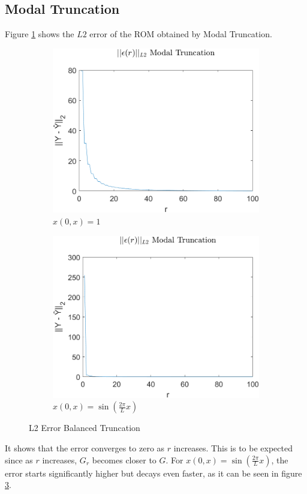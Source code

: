 \subsection{Modal Truncation}
Figure \ref{FIG-ERR-MT} shows the \(L2\) error of the ROM obtained by Modal Truncation.
\begin{figure}[H]
\begin{subfigure}[b]{0.5\textwidth}
\centering
\includegraphics[width=\textwidth]{images/L2_MT}
\caption{$x(0, x) = 1$}
\label{FIG-ERR-MT}
\end{subfigure}
\begin{subfigure}[b]{0.5\textwidth}
\centering
\includegraphics[width=\textwidth]{images/L2_MT_SIN}
\caption{$x(0, x) = \sin(\frac{2\pi}{L}x)$}
\label{FIG-ERR-MT-SIN}
\end{subfigure}
\caption{L2 Error Balanced Truncation}
\end{figure}
It shows that the error converges to zero as \(r\) increases.
This is to be expected since as \(r\) increases, \(G_r\) becomes closer to \(G\).
For \(x(0, x) = \sin(\frac{2\pi}{L}x)\), the error starts significantly higher but decays even faster, as it can be seen in figure \ref{FIG-ERR-MT-SIN}.
\newpage
